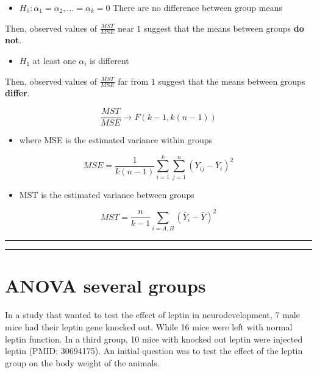\documentclass[
]{book}
\providecommand{\tightlist}{%
  \setlength{\itemsep}{0pt}\setlength{\parskip}{0pt}}
\begin{document}
\begin{itemize}
\tightlist
\item
  \(H_0: \alpha_1=\alpha_2, ...=\alpha_k=0\) There are no difference between group means
\end{itemize}

Then, observed values of \(\frac{MST}{MSE}\) near \(1\) suggest that the means between groups \textbf{do not}.

\begin{itemize}
\tightlist
\item
  \(H_1\) at least one \(\alpha_i\) is different
\end{itemize}

Then, observed values of \(\frac{MST}{MSE}\) far from \(1\) suggest that the means between groups \textbf{differ}.

\[\frac{MST}{MSE} \rightarrow F(k-1, k(n-1))\]

\begin{itemize}
\tightlist
\item
  where MSE is the estimated variance within groups
\end{itemize}

\[MSE=\frac{1}{k(n-1)} \sum_{i=1}^k\sum_{j=1}^n(Y_{ij}-\bar{Y}_i)^2\]

\begin{itemize}
\tightlist
\item
  MST is the estimated variance between groups
\end{itemize}

\[MST= \frac{n}{k-1}\sum_{i=A,B}(\bar{Y}_{i}-\bar{Y})^2\]

\begin{center}\rule{0.5\linewidth}{0.5pt}\end{center}

\begin{center}\rule{0.5\linewidth}{0.5pt}\end{center}

\hypertarget{anova-several-groups-2}{%
\section{ANOVA several groups}\label{anova-several-groups-2}}

In a study that wanted to test the effect of leptin in neurodevelopment, 7 male mice had their leptin gene knocked out. While 16 mice were left with normal leptin function. In a third group, 10 mice with knocked out leptin were injected leptin (PMID: 30694175). An initial question was to test the effect of the leptin group on the body weight of the animals.
\end{document}
